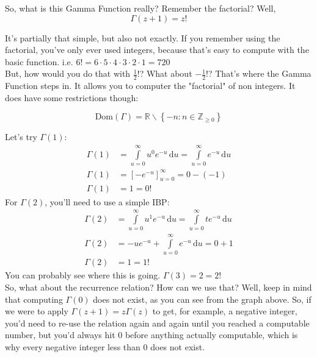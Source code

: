 \documentclass{article}
\newcommand{\du}{\, \mathrm{d}u}
\let\oldint\int
\renewcommand{\int}{\oldint\limits}
\begin{document}
	So, what is this Gamma Function really? Remember the factorial? Well,
	\begin{equation}
		\Gamma(z+1) = z!
	\end{equation}
	
	It's partially that simple, but also not exactly. If you remember using the factorial, you've only ever used integers, because that's easy to compute with the basic function. i.e. $6! = 6\cdot5\cdot4\cdot3\cdot2\cdot1 = 720$ \\
	
	But, how would you do that with $\frac{1}{2}!$? What about $-\frac{1}{2}!$? That's where the Gamma Function steps in. It allows you to computer the "factorial" of non integers. It does have some restrictions though:
	
	\begin{equation}
		\mathrm{Dom}(\Gamma) = \mathbb{R} \backslash \left\lbrace -n : n \in \mathbb{Z}_{\geq 0} \right\rbrace
	\end{equation}
	
	\noindent Let's try $\Gamma(1)$:
	\begin{equation}
		\begin{aligned}
		\Gamma(1) &= \int_{u=0}^{\infty}u^{0}e^{-u}\du = \int_{u=0}^{\infty}e^{-u}\du \\
		\Gamma(1) &= \left[-e^{-u}\right]_{u=0}^{\infty} = 0 - (- 1) \\
		\Gamma(1) &= 1 = 0!
		\end{aligned}
	\end{equation}
	\noindent For $\Gamma(2)$, you'll need to use a simple IBP: \\[5pt]
	\begin{equation}
		\begin{aligned}
			\Gamma(2) &= \int_{u=0}^{\infty}u^{1}e^{-u}\du = \int_{u=0}^{\infty}te^{-u}\du \\
			\Gamma(2) &= -ue^{-u} + \int_{u=0}^{\infty}e^{-u}\du = 0 + 1 \\
			\Gamma(2) &= 1 = 1!
		\end{aligned}
	\end{equation}
	\noindent You can probably see where this is going. $\Gamma(3) = 2 = 2!$ \\[10pt]
	So, what about the recurrence relation? How can we use that? Well, keep in mind that computing $\Gamma(0)$ does not exist, as you can see from the graph above. So, if we were to apply $\Gamma(z+1) = z\Gamma(z)$ to get, for example, a negative integer, you'd need to re-use the relation again and again until you reached a computable number, but you'd always hit $0$ before anything actually computable, which is why every negative integer less than $0$ does not exist. \\
	
\end{document}
